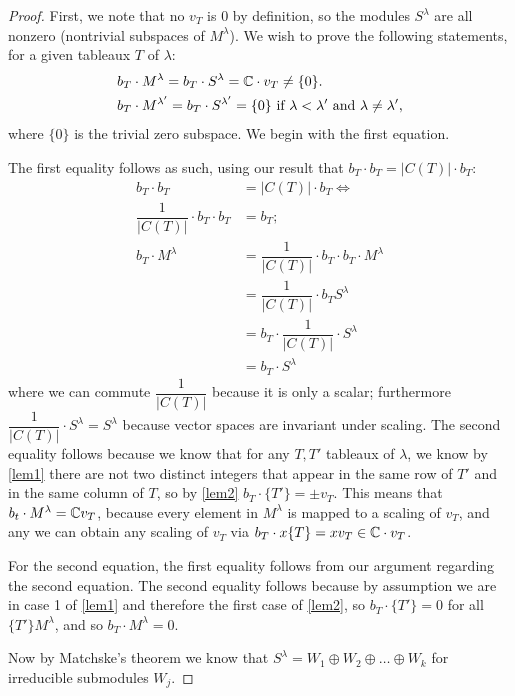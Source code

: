 \documentclass[11 pt]{amsart}
\theoremstyle{plain}   %
\theoremstyle{definition}
\theoremstyle{remark}
\numberwithin{equation}{section}
\begin{document}
\begin{proof}
  First, we note that no $v_T$ is $0$ by definition, so the modules $S^\lambda$ are all nonzero (nontrivial subspaces of $M^\lambda$).
  We wish to prove the following statements, for a given tableaux $T$ of $\lambda$:
  \begin{align}
  &b_T \cdot M^\lambda = b_T \cdot S^\lambda = \mathbb{C} \cdot v_T \neq \{0\}. \\
  &b_T \cdot M^{\lambda'} = b_T \cdot S^{\lambda'} = \{0\} \text{ if $\lambda < \lambda'$ and $\lambda \neq \lambda'$,}
  \end{align}
  where $\{0\}$ is the trivial zero subspace.
  We begin with the first equation. \par
  The first equality follows as such, using our result that $b_T \cdot b_T = |C(T)| \cdot b_T$:
  \begin{align*}
    b_T \cdot b_T &= |C(T)| \cdot b_T \iff \\
    \dfrac{1}{|C(T)|} \cdot b_T \cdot b_T &= b_T;\\
    b_T \cdot M^\lambda &= \dfrac{1}{|C(T)|} \cdot b_T \cdot b_T \cdot M^\lambda \\
                  &=\dfrac{1}{|C(T)|} \cdot b_T S^\lambda \\
                  &= b_T \cdot \dfrac{1}{|C(T)|}  \cdot S^\lambda \\
                  &= b_T \cdot S^\lambda
  \end{align*}
  where we can commute $\dfrac{1}{|C(T)|}$ because it is only a scalar; furthermore $\dfrac{1}{|C(T)|}  \cdot S^\lambda = S^\lambda$
  because vector spaces are invariant under scaling.
  The second equality follows because we know that for any $T,T'$ tableaux of $\lambda$, we know by \cref{lem1} there are not
  two distinct integers that appear in the same row of $T'$ and in the same column of $T$, so by \cref{lem2}
  $b_T \cdot \{T'\} = \pm v_T$.
  This means that $b_t \cdot M^\lambda = \mathbb{C} v_T$,
  because every element in $M^\lambda$ is mapped to a scaling of $v_T$, and any we can obtain any scaling of $v_T$ via
  $b_T \cdot x \{T\} =x v_T \in \mathbb{C} \cdot v_T$. \par
  For the second equation, the first equality follows from our argument regarding the second equation.
  The second equality follows because by assumption we are in case 1 of \cref{lem1} and therefore the first case of \cref{lem2},
  so $b_T \cdot \{T'\} = 0$ for all $\{T'\} M^\lambda$, and so $b_T \cdot M^\lambda = 0$.\par
  Now by Matchske's theorem we know that $S^\lambda = W_1 \oplus W_2 \oplus \dots \oplus W_k$ for irreducible submodules $W_j$.

\end{proof}
\end{document}
